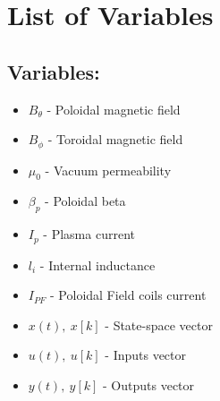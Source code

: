 \chapter*{List of Variables}
\begin{multicols}{2}
\section*{Variables:}
\begin{itemize}
\item $B_{\theta}$ - Poloidal magnetic field
\item $B_{\phi}$ - Toroidal magnetic field
\item $\mu_0$ - Vacuum permeability
\item $\beta_p$ - Poloidal beta
\item $I_p$ - Plasma current
\item $l_i$ - Internal inductance
\item $I_{PF}$ - Poloidal Field coils current
\item $x(t),~x[k]$ - State-space vector
\item $u(t),~u[k]$ - Inputs vector
\item $y(t),~y[k]$ - Outputs vector
\end{itemize}

\end{multicols}